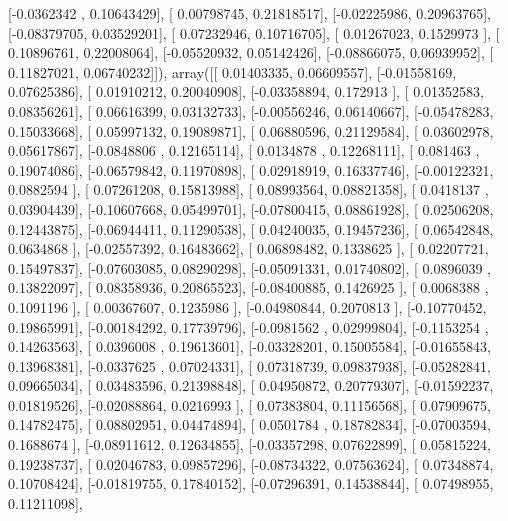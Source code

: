 \documentclass{article}
\begin{document}
       [-0.0362342 ,  0.10643429],
       [ 0.00798745,  0.21818517],
       [-0.02225986,  0.20963765],
       [-0.08379705,  0.03529201],
       [ 0.07232946,  0.10716705],
       [ 0.01267023,  0.1529973 ],
       [ 0.10896761,  0.22008064],
       [-0.05520932,  0.05142426],
       [-0.08866075,  0.06939952],
       [ 0.11827021,  0.06740232]]), array([[ 0.01403335,  0.06609557],
       [-0.01558169,  0.07625386],
       [ 0.01910212,  0.20040908],
       [-0.03358894,  0.172913  ],
       [ 0.01352583,  0.08356261],
       [ 0.06616399,  0.03132733],
       [-0.00556246,  0.06140667],
       [-0.05478283,  0.15033668],
       [ 0.05997132,  0.19089871],
       [ 0.06880596,  0.21129584],
       [ 0.03602978,  0.05617867],
       [-0.0848806 ,  0.12165114],
       [ 0.0134878 ,  0.12268111],
       [ 0.081463  ,  0.19074086],
       [-0.06579842,  0.11970898],
       [ 0.02918919,  0.16337746],
       [-0.00122321,  0.0882594 ],
       [ 0.07261208,  0.15813988],
       [ 0.08993564,  0.08821358],
       [ 0.0418137 ,  0.03904439],
       [-0.10607668,  0.05499701],
       [-0.07800415,  0.08861928],
       [ 0.02506208,  0.12443875],
       [-0.06944411,  0.11290538],
       [ 0.04240035,  0.19457236],
       [ 0.06542848,  0.0634868 ],
       [-0.02557392,  0.16483662],
       [ 0.06898482,  0.1338625 ],
       [ 0.02207721,  0.15497837],
       [-0.07603085,  0.08290298],
       [-0.05091331,  0.01740802],
       [ 0.0896039 ,  0.13822097],
       [ 0.08358936,  0.20865523],
       [-0.08400885,  0.1426925 ],
       [ 0.0068388 ,  0.1091196 ],
       [ 0.00367607,  0.1235986 ],
       [-0.04980844,  0.2070813 ],
       [-0.10770452,  0.19865991],
       [-0.00184292,  0.17739796],
       [-0.0981562 ,  0.02999804],
       [-0.1153254 ,  0.14263563],
       [ 0.0396008 ,  0.19613601],
       [-0.03328201,  0.15005584],
       [-0.01655843,  0.13968381],
       [-0.0337625 ,  0.07024331],
       [ 0.07318739,  0.09837938],
       [-0.05282841,  0.09665034],
       [ 0.03483596,  0.21398848],
       [ 0.04950872,  0.20779307],
       [-0.01592237,  0.01819526],
       [-0.02088864,  0.0216993 ],
       [ 0.07383804,  0.11156568],
       [ 0.07909675,  0.14782475],
       [ 0.08802951,  0.04474894],
       [ 0.0501784 ,  0.18782834],
       [-0.07003594,  0.1688674 ],
       [-0.08911612,  0.12634855],
       [-0.03357298,  0.07622899],
       [ 0.05815224,  0.19238737],
       [ 0.02046783,  0.09857296],
       [-0.08734322,  0.07563624],
       [ 0.07348874,  0.10708424],
       [-0.01819755,  0.17840152],
       [-0.07296391,  0.14538844],
       [ 0.07498955,  0.11211098],
\end{document}
